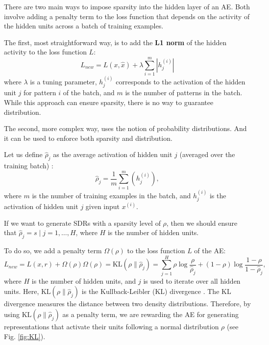 \documentclass[runningheads]{llncs}
\begin{document}
There are two main ways to impose sparsity into the hidden layer of an AE. Both involve adding a penalty term to the loss function that depends on the activity of the hidden units across a batch of training examples.

The first, most straightforward way, is to add the \textbf{L1 norm} of the hidden activity to the loss function $L$:
\begin{equation}
\label{eqn:l1norm}
    L_{new} = L(x, \hat{x})+\lambda \sum_{i=1}^{m}\left|h_{j}^{(i)}\right|
\end{equation}
where $\lambda$ is a tuning parameter, $h_{j}^{(i)}$ corresponds to the activation of the hidden unit $j$ for pattern $i$ of the batch, and $m$ is the number of patterns in the batch. While this approach can ensure sparsity, there is no way to guarantee distribution.

The second, more complex way, uses the notion of probability distributions. And it can be used to enforce both sparsity and distribution.

Let us define $\hat{\rho}_{j}$ as the average activation of hidden unit $j$ (averaged over the training batch) \cite{ng2011sparse}:
\begin{equation}
    \hat{\rho}_{j}=\frac{1}{m} \sum_{i=1}^{m}\left(h_{j}^{(i)}\right),
\end{equation}
where $m$ is the number of training examples in the batch, and $h_{j}^{(i)}$ is the activation of hidden unit $j$ given input $x^{(i)}$.

If we want to generate SDRs with a sparsity level of $\rho$, then we should ensure that $\hat\rho_{j}=s \mid j=1, \dots,H$, where $H$ is the number of hidden units.

To do so, we add a penalty term $\Omega(\rho)$ to the loss function $L$ of the AE:
\begin{subequations}
    \begin{equation}
        L_{new} = L(x,r) + \Omega(\rho)
    \end{equation}
    
    \begin{equation}
    \label{eqn:KLdiv}
        \Omega(\rho) = \mathrm{KL}\left(\rho \| \hat{\rho}_{j}\right) =  \sum_{j=1}^{H} \rho \log \frac{\rho}{\hat{\rho}_{j}}+(1-\rho) \log \frac{1-\rho}{1-\hat{\rho}_{j}},
    \end{equation}
\end{subequations}
where $H$ is the number of hidden units, and $j$ is used to iterate over all hidden units. Here, $\mathrm{KL}\left(\rho \| \hat{\rho}_{j}\right)$ is the  Kullback-Leibler (KL) divergence \cite{kullback1951information}. The KL divergence measures the distance between two density distributions. Therefore, by using $\mathrm{KL}\left(\rho \| \hat{\rho}_{j}\right)$ as a penalty term, we are rewarding the AE for generating representations that activate their units following a normal distribution $\rho$ (see Fig. \ref{fig:KL}).
\end{document}
